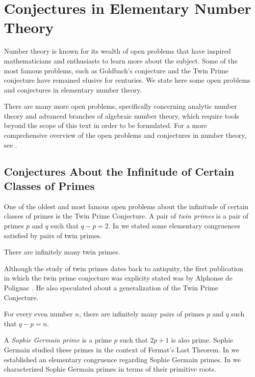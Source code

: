 \chapter{Conjectures in Elementary Number Theory}

Number theory is known for its wealth of open problems that have inspired mathematicians and enthusiasts to learn more about the subject. Some of the most famous problems, such as Goldbach's conjecture and the Twin Prime conjecture have remained elusive for centuries. We state here some open problems and conjectures in elementary number theory.

There are many more open problems, specifically concerning analytic number theory and advanced branches of algebraic number theory, which require tools beyond the scope of this text in order to be formulated. For a more comprehensive overview of the open problems and conjectures in number theory, see \cite{guy2004}.

\section{Conjectures About the Infinitude of Certain Classes of Primes}

One of the oldest and most famous open problems about the infinitude of certain classes of primes is the Twin Prime Conjecture. A pair of \emph{twin primes} is a pair of primes $p$ and $q$ such that $q-p=2$. In  we stated some elementary congruences satisfied by pairs of twin primes.

\begin{conjecture}
  There are infinitely many twin primes.
\end{conjecture}

Although the study of twin primes dates back to antiquity, the first publication in which the twin prime conjecture was explicity stated was by Alphonse de Polignac \cite{polignac1846}. He also speculated about a generalization of the Twin Prime Conjecture.

\begin{conjecture}
  For every even number $n$, there are infinitely many pairs of primes $p$ and $q$ such that $q-p=n$.
\end{conjecture}

A \emph{Sophie Germain prime} is a prime $p$ such that $2p+1$ is also prime. Sophie Germain studied these primes in the context of Fermat's Last Theorem. In  we established an elementary congruence regarding Sophie Germain primes. In  we characterized Sophie Germain primes in terms of their primitive roots.

